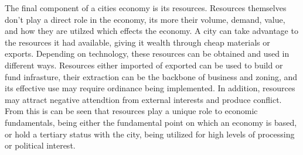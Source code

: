 The final component of a cities economy is its resources. Resources themselves don't play a direct role in the economy, its more their volume, demand, value, and how they are utilzed which effects the economy. A city can take advantage to the resources it had available, giving it wealth through cheap materials or exports. Depending on technology, these resources can be obtained and used in different ways. Resources either imported of exported can be used to build or fund infrasture, their extraction can be the backbone of business and zoning, and its effective use may require ordinance being implemented. In addition, resources may attract negative attendtion from external interests and produce conflict. From this is can be seen that resources play a unique role to economic fundamentals, being either the fundamental point on which an economy is based, or hold a tertiary status with the city, being utilized for high levels of processing or political interest.




